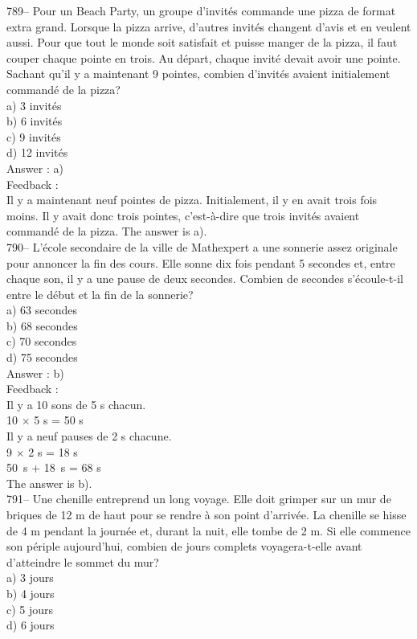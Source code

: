 \documentclass[letterpaper, 12pt]{article}
\begin{document}
789-- Pour un \og Beach Party\fg , un groupe d'invit\'es commande
une pizza de format extra grand.  Lorsque la pizza arrive, d'autres
invit\'es changent d'avis et en veulent aussi.  Pour que tout le
monde soit satisfait et puisse manger de la pizza, il faut couper
chaque pointe en trois.  Au d\'epart, chaque invit\'e devait avoir
une pointe.  Sachant qu'il y a maintenant 9
pointes, combien d'invit\'es avaient initialement command\'e de la pizza?\\
a) 3 invit\'es\\
b) 6 invit\'es\\
c) 9 invit\'es\\
d) 12 invit\'es\\

Answer : a)\\

Feedback : \\
Il y a maintenant neuf pointes de pizza.  Initialement, il y en avait trois
fois moins.  Il y avait donc trois pointes, c'est-\`a-dire que trois
invit\'es avaient command\'e de la pizza.  The answer is a).\\

790-- L'\'ecole secondaire de la ville de Mathexpert a une sonnerie assez
originale pour annoncer la fin des cours.  Elle sonne dix fois pendant 5
secondes et, entre chaque son, il y a une pause de deux secondes.  Combien
de secondes s'\'ecoule-t-il entre le d\'ebut et la fin de la sonnerie?\\
a) 63 secondes\\
b) 68 secondes\\
c) 70 secondes\\
d) 75 secondes\\

Answer : b)\\

Feedback : \\
Il y a 10 sons de 5 s chacun.\\
10 $\times$ 5 s  = 50 s \\
Il y a neuf pauses de 2 s chacune.\\
9 $\times$ 2 s = 18 s \\
50~s + 18~s = 68 s\\
The answer is b).\\

791-- Une chenille entreprend un long voyage.  Elle doit grimper sur un mur
de briques de 12 m de haut pour se rendre \`a son point d'arriv\'ee.  La
chenille se hisse de 4 m pendant la journ\'ee et, durant la nuit, elle tombe
de 2 m.  Si elle commence son p\'eriple aujourd'hui, combien de jours
complets voyagera-t-elle avant d'atteindre le sommet du mur?\\
a) 3 jours\\
b) 4 jours\\
c) 5 jours\\
d) 6 jours\\
\end{document}
